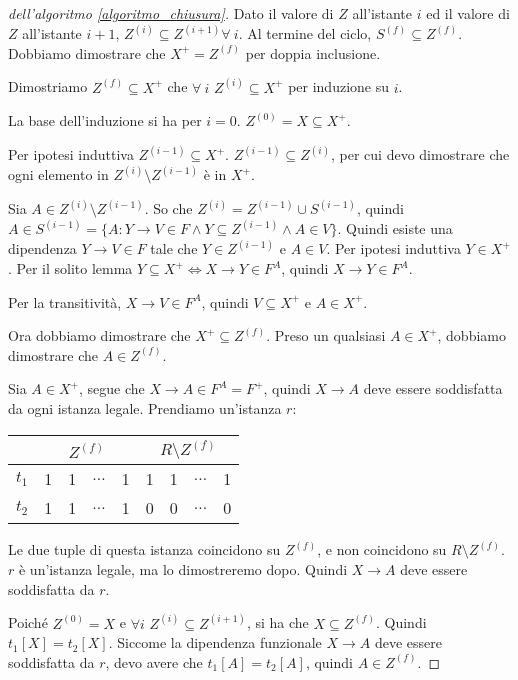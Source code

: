 \begin{proof}[dell'algoritmo \ref{algoritmo_chiusura}]
Dato il valore di $Z$ all'istante $i$ ed il valore di $Z$ all'istante $i + 1$, $Z^{(i)} \subseteq Z^{(i+1)} \forall \ i$. Al termine del ciclo, $S^{(f)} \subseteq Z^{(f)}$. Dobbiamo dimostrare che $X^+ = Z^{(f)}$ per doppia inclusione.

Dimostriamo $Z^{(f)} \subseteq X^+$ che $\forall \ i $ $Z^{(i)} \subseteq X^+$ per induzione su $i$.

La base dell'induzione si ha per $i = 0$. $Z^{(0)} = X \subseteq X^+$.

Per ipotesi induttiva $Z^{(i-1)} \subseteq X^+$. $Z^{(i-1)} \subseteq Z^{(i)}$, per cui devo dimostrare che ogni elemento in $Z^{(i)} \setminus Z^{(i - 1)}$ \`e in $X^+$.

Sia $A \in Z^{(i)} \setminus Z^{(i - 1)}$. So che $Z^{(i)} = Z^{(i - 1)} \cup S^{(i - 1)}$, quindi $A \in S^{(i-1)} = \{ A : Y \to V \in F \land Y \subseteq Z^{(i-1)} \land A \in V\}$. Quindi esiste una dipendenza $Y \to V \in F$ tale che $Y \in Z^{(i-1)}$ e $A \in V$. Per ipotesi induttiva $Y \in X^+$. Per il solito lemma $Y \subseteq X^+ \iff X \to Y \in F^A$, quindi $X \to Y \in F^A$.

Per la transitivit\`a, $X \to V \in F^A$, quindi $V \subseteq X^+$ e $A \in X^+$.

Ora dobbiamo dimostrare che $X^+ \subseteq Z^{(f)}$. Preso un qualsiasi $A \in X^+$, dobbiamo dimostrare che $A \in Z^{(f)}$.

Sia $A \in X^+$, segue che $X \to A \in F^A = F^+$, quindi $X \to A$ deve essere soddisfatta da ogni istanza legale. Prendiamo un'istanza $r$:

\begin{center}
\begin{tabular}{|l |*{8}{c|}}
\hline
& \multicolumn{4}{|c|}{$Z^{(f)}$} & \multicolumn{4}{|c|}{$R \setminus Z^{(f)}$} \\
\hline
$t_1$ & 1 & 1 & $\dots$ & 1 & 1 & 1 & $\dots$ & 1 \\
\hline
$t_2$ & 1 & 1 & $\dots$ & 1 & 0 & 0 & $\dots$ & 0 \\
\hline 
\end{tabular}
\end{center}

Le due tuple di questa istanza coincidono su $Z^{(f)}$, e non coincidono su $R \setminus Z^{(f)}$. $r$ \`e un'istanza legale, ma lo dimostreremo dopo. Quindi $X \to A$ deve essere soddisfatta da $r$.

Poich\'e $Z^{(0)} = X$ e $\forall i$ $Z^{(i)} \subseteq Z^{(i+1)}$, si ha che $X \subseteq Z^{(f)}$. Quindi $t_1[X] = t_2[X]$. Siccome la dipendenza funzionale $X \to A$ deve essere soddisfatta da $r$, devo avere che $t_1[A] = t_2[A]$, quindi $A \in Z^{(f)}$.


\end{proof}
